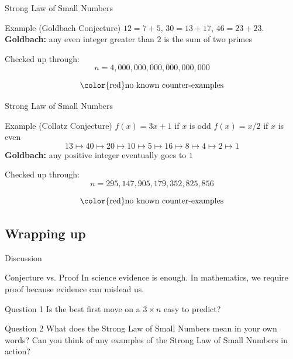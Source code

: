 \documentclass{beamer}
\begin{document}
\begin{frame}{Strong Law of Small Numbers}
\pause
  \begin{block}{Example (Goldbach Conjecture)}
\pause
    $12 = 7 + 5$, $30 = 13+17$, $46 = 23 + 23$.
\pause
    \textbf{Goldbach:} any even integer greater than $2$ is the sum of two primes
  \end{block}
\pause
  \begin{block}{Checked up through:}
    $$n=4,000,000,000,000,000,000$$
  \end{block}
\pause
$$\text{\color{red}no known counter-examples}$$
\end{frame}

\begin{frame}{Strong Law of Small Numbers}
\pause
  \begin{block}{Example (Collatz Conjecture)}
\pause
    $f(x) = 3x+1$ if $x$ is odd
\pause
    $f(x) = x/2$ if $x$ is even
\pause 
    $$13\mapsto 40\mapsto 20\mapsto 10\mapsto 5\mapsto 16\mapsto 8\mapsto 4\mapsto 2\mapsto 1$$
\pause
    \textbf{Goldbach:} any positive integer eventually goes to $1$
  \end{block}
\pause
  \begin{block}{Checked up through:}
    $$n=295,147,905,179,352,825,856$$
  \end{block}
\pause
$$\text{\color{red}no known counter-examples}$$
\end{frame}

\subsection{Wrapping up}

\begin{frame}{Discussion}
\pause
  \begin{block}{Conjecture vs. Proof}
    In science evidence is enough.
    In mathematics, we require proof because evidence can mislead us.
  \end{block}
\pause
  \begin{block}{Question 1}
    Is the best first move on a $3\times n$ easy to predict?
  \end{block}
\pause
  \begin{block}{Question 2}
    What does the Strong Law of Small Numbers mean in your own words?
    Can you think of any examples of the Strong Law of Small Numbers in action?
  \end{block}
\end{frame}
\end{document}
